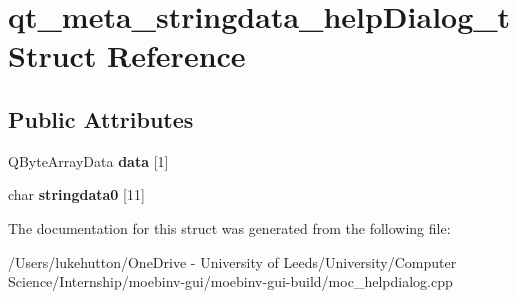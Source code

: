 \hypertarget{structqt__meta__stringdata__help_dialog__t}{}\section{qt\+\_\+meta\+\_\+stringdata\+\_\+help\+Dialog\+\_\+t Struct Reference}
\label{structqt__meta__stringdata__help_dialog__t}
\subsection*{Public Attributes}
\begin{DoxyCompactItemize}
\item 
\mbox{\label{structqt__meta__stringdata__help_dialog__t_a3e6a8b85a92334ef4a1f5ef5d4ff65d9}} 
Q\+Byte\+Array\+Data {\bfseries data} \mbox{[}1\mbox{]}
\item 
\mbox{\label{structqt__meta__stringdata__help_dialog__t_ae8fbd8a9b4ed0a5843c3fbd6410e0265}} 
char {\bfseries stringdata0} \mbox{[}11\mbox{]}
\end{DoxyCompactItemize}


The documentation for this struct was generated from the following file\+:\begin{DoxyCompactItemize}
\item 
/\+Users/lukehutton/\+One\+Drive -\/ University of Leeds/\+University/\+Computer Science/\+Internship/moebinv-\/gui/moebinv-\/gui-\/build/moc\+\_\+helpdialog.\+cpp\end{DoxyCompactItemize}
